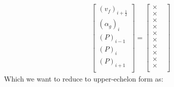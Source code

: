 \documentclass[11pt,letterpaper,titlepage]{article}
\newcommand{\half}{\frac{1}{2}}
\begin{document}
\begin{equation*}
\begin{aligned}
\begin{bmatrix}
(v_f)_{i+\half}   \\
(\alpha_g)_i  \\
(P)_{i-1}  \\
(P)_{i}  \\
(P)_{i+1}  \\
\end{bmatrix}
=
\begin{bmatrix}
\times &\\ 
\times &\\ 
\times &\\ 
\times &\\ 
\times &\\ 
\times &\\ 
\times &\\ 
\times &\\ 
\times &\\
\times &\\
\end{bmatrix}
\end{aligned}
\end{equation*}
\newline
\noindent Which we want to reduce to upper-echelon form as:
\end{document}
